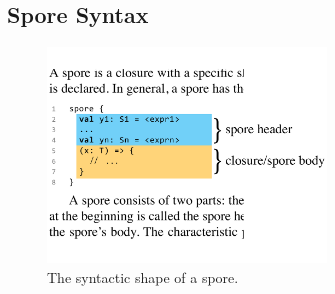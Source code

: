 \documentclass{easychair}
\begin{document}





\subsection{Spore Syntax}
\label{sec:spore-syntax}

\setlength{\belowcaptionskip}{-6pt}
\begin{figure}[t!]
\centering
\includegraphics[width=7.4cm]{spore-shape.pdf}
\caption{The syntactic shape of a spore.}
\label{fig:spore-shape}
\end{figure}
\setlength{\belowcaptionskip}{0pt}
\end{document}
